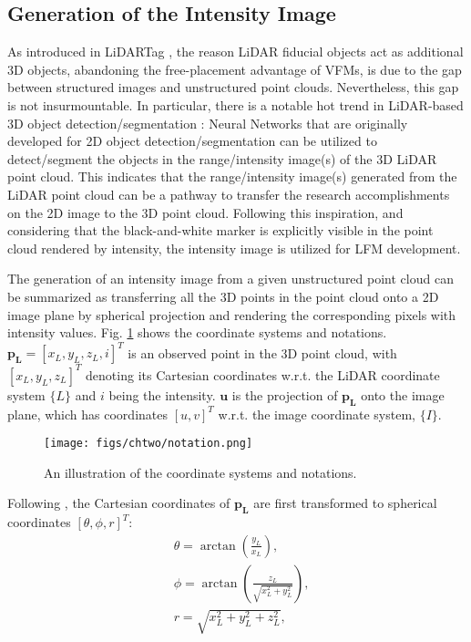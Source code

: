 \subsection{Generation of the Intensity Image} \label{twotwoone}
As introduced in LiDARTag \cite{lt}, the reason LiDAR fiducial objects act as additional 3D objects, abandoning the free-placement advantage of VFMs, is due to the gap between structured images and unstructured point clouds.
%
Nevertheless, this gap is not insurmountable. In particular, there is a notable hot trend in LiDAR-based 3D object detection/segmentation \cite{rangenet,lasernet}: Neural Networks that are originally developed for 2D object detection/segmentation can be utilized to detect/segment the objects in the range/intensity image(s) of the 3D LiDAR point cloud. This indicates that the range/intensity image(s) generated from the LiDAR point cloud can be a pathway to transfer the research accomplishments on the 2D image to the 3D point cloud. Following this inspiration, and considering that the black-and-white marker is explicitly visible in the point cloud rendered by intensity, the intensity image is utilized for LFM development.
\par
The generation of an intensity image from a given unstructured point cloud can be summarized as transferring all the 3D points in the point cloud onto a 2D image plane by spherical projection and rendering the corresponding pixels with intensity values. Fig. \ref{notation} shows the coordinate systems and notations. $\mathbf{p_{L}}=[x_{L},y_{L},z_{L},i]^{T}$ is an observed point in the 3D point cloud, with ${[x_{L},y_{L},z_{L}]^{T}}$ denoting its Cartesian coordinates w.r.t. the LiDAR coordinate system $\{L\}$ and $i$ being the intensity.  $\mathbf{u}$ is the projection of $\mathbf{p_{L}}$ onto the image plane, which has coordinates $[u,v]^{T}$ w.r.t. the image coordinate system, $\{I\}$. 
\begin{figure}[H]
	\centering
	\texttt{[image: figs/chtwo/notation.png]}	
	\caption{An illustration of the coordinate systems and notations.}
	\label{notation}
\end{figure}
Following \cite{barfoot}, the Cartesian coordinates of $\mathbf{p_{L}}$ are first transformed to spherical coordinates $[\theta,\phi,r]^{T}$:
\begin{equation}	
	\begin{aligned}
		& \theta=\arctan(\frac{y_{L}}{x_{L}}),\\
		& \phi=\arctan(\frac{z_{L}}{\sqrt{x_{L}^{2}+y_{L}^2}}),\\
		& r=\sqrt{x_{L}^2+y_{L}^2+z_{L}^2},
	\end{aligned}\label{pro}
\end{equation}
